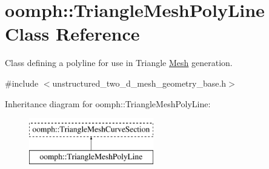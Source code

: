 \hypertarget{classoomph_1_1TriangleMeshPolyLine}{}\section{oomph\+:\+:Triangle\+Mesh\+Poly\+Line Class Reference}
\label{classoomph_1_1TriangleMeshPolyLine}


Class defining a polyline for use in Triangle \hyperlink{classoomph_1_1Mesh}{Mesh} generation.  




{\ttfamily \#include $<$unstructured\+\_\+two\+\_\+d\+\_\+mesh\+\_\+geometry\+\_\+base.\+h$>$}

Inheritance diagram for oomph\+:\+:Triangle\+Mesh\+Poly\+Line\+:\begin{figure}[H]
\begin{center}
\leavevmode
\includegraphics[height=2.000000cm]{classoomph_1_1TriangleMeshPolyLine}
\end{center}
\end{figure}
